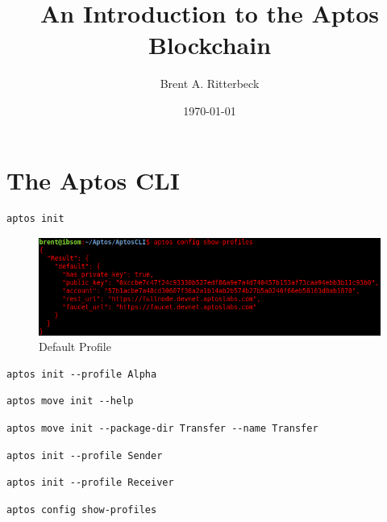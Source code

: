 \documentclass[12pt]{book}
\title{An Introduction to the Aptos Blockchain}
\author{Brent A. Ritterbeck}
\date{\today}
\theoremstyle{definition}
\theoremstyle{plain}
\begin{document}
\maketitle

\chapter{The Aptos CLI}

\begin{lstlisting}[caption={Creating a Default Profile}]
aptos init
\end{lstlisting}

\begin{figure}[htp]
\centering
\includegraphics[scale=0.50]{./images/default_profile.png}
\caption{Default Profile}
\end{figure}

\begin{lstlisting}[caption={Creating a Named Profile}]
aptos init --profile Alpha
\end{lstlisting}

\begin{lstlisting}[caption={Show Initial Project Options}]
aptos move init --help
\end{lstlisting}

\begin{lstlisting}[caption={Create Project Shell}]
aptos move init --package-dir Transfer --name Transfer
\end{lstlisting}

\begin{lstlisting}[caption={Create Sender Profile}]
aptos init --profile Sender
\end{lstlisting}

\begin{lstlisting}[caption={Create Receiver Profile}]
aptos init --profile Receiver
\end{lstlisting}

\begin{lstlisting}[caption={Show Profiles}]
aptos config show-profiles
\end{lstlisting}
\end{document}
